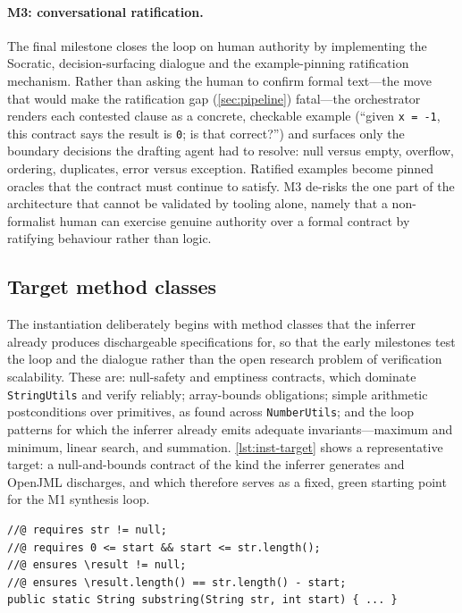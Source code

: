 \paragraph{M3: conversational ratification.} The final milestone closes the loop on human authority by implementing the Socratic, decision-surfacing dialogue and the example-pinning ratification mechanism. Rather than asking the human to confirm formal text---the move that would make the ratification gap (\cref{sec:pipeline}) fatal---the orchestrator renders each contested clause as a concrete, checkable example (``given \texttt{x = -1}, this contract says the result is \texttt{0}; is that correct?'') and surfaces only the boundary decisions the drafting agent had to resolve: null versus empty, overflow, ordering, duplicates, error versus exception. Ratified examples become pinned oracles that the contract must continue to satisfy. M3 de-risks the one part of the architecture that cannot be validated by tooling alone, namely that a non-formalist human can exercise genuine authority over a formal contract by ratifying behaviour rather than logic.

\subsection{Target method classes}
\label{subsec:inst-targets}

The instantiation deliberately begins with method classes that the inferrer already produces dischargeable specifications for, so that the early milestones test the loop and the dialogue rather than the open research problem of verification scalability. These are: null-safety and emptiness contracts, which dominate \texttt{StringUtils} and verify reliably; array-bounds obligations; simple arithmetic postconditions over primitives, as found across \texttt{NumberUtils}; and the loop patterns for which the inferrer already emits adequate invariants---maximum and minimum, linear search, and summation. \cref{lst:inst-target} shows a representative target: a null-and-bounds contract of the kind the inferrer generates and OpenJML discharges, and which therefore serves as a fixed, green starting point for the M1 synthesis loop.

\begin{lstlisting}[style=code,caption={A representative green target: a null-and-bounds contract of the class the inferrer already discharges, used as the fixed contract for the M1 synthesis loop.},label={lst:inst-target}]
//@ requires str != null;
//@ requires 0 <= start && start <= str.length();
//@ ensures \result != null;
//@ ensures \result.length() == str.length() - start;
public static String substring(String str, int start) { ... }
\end{lstlisting}

